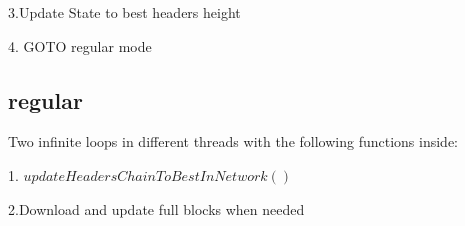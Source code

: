 \documentclass[]{report}   %
\begin{document}
3.Update State to best headers height


4. GOTO regular mode


\subsection{regular}

Two infinite loops in different threads with the following functions inside:

1. $updateHeadersChainToBestInNetwork()$

2.Download and update full blocks when needed
\end{document}
